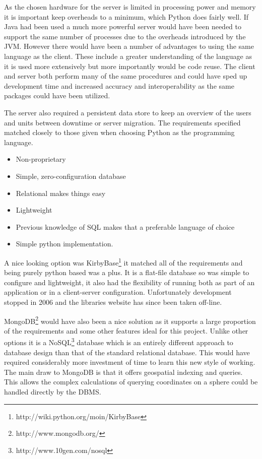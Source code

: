 As the chosen hardware for the server is limited in processing power and memory it is important keep overheads to a minimum, which Python does fairly well. If Java had been used a much more powerful server would have been needed to support the same number of processes due to the overheads introduced by the JVM. However there would have been a number of advantages to using the same language as the client. These include a greater understanding of the language as it is used more extensively but more importantly would be code reuse. The client and server both perform many of the same procedures and could have sped up development time and increased accuracy and interoperability as the same packages could have been utilized.

The server also required a persistent data store to keep an overview of the users and units between downtime or server migration. The requirements specified matched closely to those given when choosing Python as the programming language. 

\begin{itemize}
\item Non-proprietary
\item Simple, zero-configuration database
\item Relational makes things easy
\item Lightweight
\item Previous knowledge of SQL makes that a preferable language of choice
\item Simple python implementation.
\end{itemize}

A nice looking option was KirbyBase\footnote{http://wiki.python.org/moin/KirbyBase} it matched all of the requirements and being purely python based was a plus. It is a flat-file database so was simple to configure and lightweight, it also had the flexibility of running both as part of an application or in a client-server configuration. Unfortunately development stopped in 2006 and the libraries website has since been taken off-line.

MongoDB\footnote{http://www.mongodb.org/} would have also been a nice solution as it supports a large proportion of the requirements and some other features ideal for this project. Unlike other options it is a NoSQL\footnote{http://www.10gen.com/nosql} database which is an entirely different approach to database design than that of the standard relational database. This would have required considerably more investment of time to learn this new style of working. The main draw to MongoDB is that it offers geospatial indexing and queries. This allows the complex calculations of querying coordinates on a sphere could be handled directly by the DBMS.


